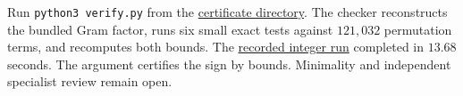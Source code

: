 \documentclass[10pt]{article}
\begin{document}
Run \texttt{python3 verify.py} from the
\href{https://github.com/Leo66Gao/solved-conjectures/tree/main/19-bapat-q-permanent/order-8192}{certificate directory}.
The checker reconstructs the bundled Gram factor, runs six small exact
tests against $121{,}032$ permutation terms, and recomputes both bounds.
The \href{https://github.com/Leo66Gao/solved-conjectures/blob/main/19-bapat-q-permanent/order-8192/verification-local.txt}{recorded integer run}
completed in $13.68$ seconds. The argument certifies the sign by bounds.
Minimality and independent specialist review remain open.
\end{document}
